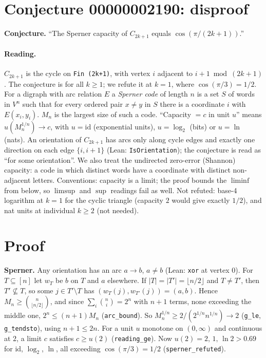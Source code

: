 \documentclass[11pt]{article}
\begin{document}
\section*{Conjecture 00000002190: disproof}
\textbf{Conjecture.} ``The Sperner capacity of $C_{2k+1}$ equals $\cos(\pi/(2k+1))$.''

\paragraph{Reading.} $C_{2k+1}$ is the cycle on \texttt{Fin (2k+1)}, with vertex $i$ adjacent to $i+1 \bmod (2k+1)$. The conjecture is for all $k\ge 1$; we refute it at $k=1$, where $\cos(\pi/3)=1/2$.
For a digraph with arc relation $E$ a \emph{Sperner code} of length $n$ is a set $S$ of words in $V^n$ such that for every ordered pair $x\neq y$ in $S$ there is a coordinate $i$ with $E(x_i,y_i)$. $M_n$ is the largest size of such a code. ``Capacity $=c$ in unit $u$'' means $u(M_n^{1/n})\to c$, with $u=\mathrm{id}$ (exponential units), $u=\log_2$ (bits) or $u=\ln$ (nats). An orientation of $C_{2k+1}$ has arcs only along cycle edges and exactly one direction on each edge $\{i,i+1\}$ (Lean: \texttt{IsOrientation}); the conjecture is read as ``for some orientation''. We also treat the undirected zero-error (Shannon) capacity: a code in which distinct words have a coordinate with distinct non-adjacent letters.
Conventions: capacity is a limit; the proof bounds the $\liminf$ from below, so $\limsup$ and $\sup$ readings fail as well. Not refuted: base-4 logarithm at $k=1$ for the cyclic triangle (capacity $2$ would give exactly $1/2$), and nat units at individual $k\ge2$ (not needed).

\section*{Proof}
\textbf{Sperner.} Any orientation has an arc $a\to b$, $a\neq b$ (Lean: \texttt{xor} at vertex $0$). For $T\subseteq[n]$ let $w_T$ be $b$ on $T$ and $a$ elsewhere. If $|T|=|T'|=\lfloor n/2\rfloor$ and $T\neq T'$, then $T'\not\subseteq T$, so some $j\in T'\setminus T$ has $(w_T(j),w_{T'}(j))=(a,b)$. Hence $M_n\ge\binom{n}{\lfloor n/2\rfloor}$, and since $\sum_i\binom ni=2^n$ with $n+1$ terms, none exceeding the middle one, $2^n\le (n+1)M_n$ (\texttt{arc\_bound}). So $M_n^{1/n}\ge 2/(2^{1/n}n^{1/n})\to 2$ (\texttt{g\_le}, \texttt{g\_tendsto}), using $n+1\le 2n$. For a unit $u$ monotone on $(0,\infty)$ and continuous at $2$, a limit $c$ satisfies $c\ge u(2)$ (\texttt{reading\_ge}). Now $u(2)=2,\,1,\,\ln 2>0.69$ for id, $\log_2$, $\ln$, all exceeding $\cos(\pi/3)=1/2$ (\texttt{sperner\_refuted}).
\end{document}
